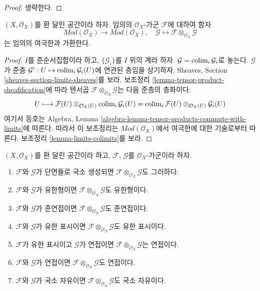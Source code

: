 \begin{proof}
생략한다.
\end{proof}

\begin{lemma}
\label{lemma-tensor-commute-colimits}
$(X, \mathcal{O}_X)$를 환 달린 공간이라 하자.
임의의 $\mathcal{O}_X$-가군 $\mathcal{F}$에 대하여 함자
$$
\textit{Mod}(\mathcal{O}_X) \longrightarrow \textit{Mod}(\mathcal{O}_X)
, \quad
\mathcal{G} \longmapsto \mathcal{F} \otimes_{\mathcal{O}_X} \mathcal{G}
$$
는 임의의 여극한과 가환한다.
\end{lemma}

\begin{proof}
$I$를 준순서집합이라 하고, $\{\mathcal{G}_i\}$를 $I$ 위의 계라 하자.
$\mathcal{G} = \mathop{\mathrm{colim}}\nolimits_i \mathcal{G}_i$로 놓는다. $\mathcal{G}$가 준층
$\mathcal{G}' : U \mapsto \mathop{\mathrm{colim}}\nolimits_i \mathcal{G}_i(U)$에 연관된 층임을
상기하자. Sheaves, Section \ref{sheaves-section-limits-sheaves}를 보라.
보조정리 \ref{lemma-tensor-product-sheafification}에 따라 텐서곱
$\mathcal{F} \otimes_{\mathcal{O}_X} \mathcal{G}$는 다음 준층의 층화이다.
$$
U \longmapsto
\mathcal{F}(U) \otimes_{\mathcal{O}_X(U)} \mathop{\mathrm{colim}}\nolimits_i \mathcal{G}_i(U) =
\mathop{\mathrm{colim}}\nolimits_i \mathcal{F}(U) \otimes_{\mathcal{O}_X(U)} \mathcal{G}_i(U)
$$
여기서 등호는 Algebra, Lemma
\ref{algebra-lemma-tensor-products-commute-with-limits}에 따른다.
따라서 이 보조정리는 $\textit{Mod}(\mathcal{O}_X)$에서 여극한에 대한
기술로부터 따른다. 보조정리 \ref{lemma-limits-colimits}를 보라.
\end{proof}

\begin{lemma}
\label{lemma-tensor-product-permanence}
$(X, \mathcal{O}_X)$를 환 달린 공간이라 하고,
$\mathcal{F}$, $\mathcal{G}$를 $\mathcal{O}_X$-가군이라 하자.
\begin{enumerate}
\item $\mathcal{F}$와 $\mathcal{G}$가 단면들로 국소 생성되면
$\mathcal{F} \otimes_{\mathcal{O}_X} \mathcal{G}$도 그러하다.
\item $\mathcal{F}$와 $\mathcal{G}$가 유한형이면
$\mathcal{F} \otimes_{\mathcal{O}_X} \mathcal{G}$도 유한형이다.
\item $\mathcal{F}$와 $\mathcal{G}$가 준연접이면
$\mathcal{F} \otimes_{\mathcal{O}_X} \mathcal{G}$도 준연접이다.
\item $\mathcal{F}$와 $\mathcal{G}$가 유한 표시이면
$\mathcal{F} \otimes_{\mathcal{O}_X} \mathcal{G}$도 유한 표시이다.
\item $\mathcal{F}$가 유한 표시이고 $\mathcal{G}$가 연접이면
$\mathcal{F} \otimes_{\mathcal{O}_X} \mathcal{G}$는 연접이다.
\item $\mathcal{F}$와 $\mathcal{G}$가 연접이면
$\mathcal{F} \otimes_{\mathcal{O}_X} \mathcal{G}$도 연접이다.
\item $\mathcal{F}$와 $\mathcal{G}$가 국소 자유이면
$\mathcal{F} \otimes_{\mathcal{O}_X} \mathcal{G}$도 국소 자유이다.
\end{enumerate}
\end{lemma}

